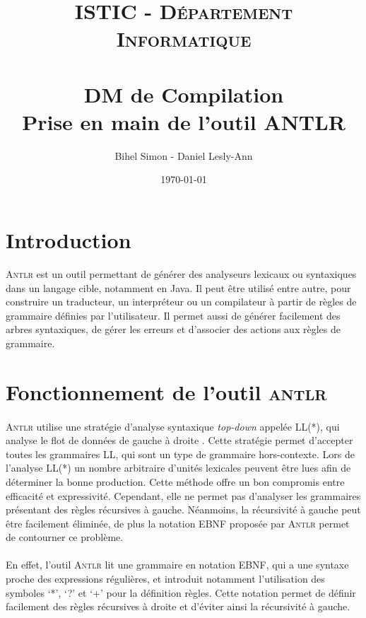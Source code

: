 \documentclass[paper=a4, fontsize=11pt]{scrartcl} %
\title{	
\normalfont \normalsize 
\textsc{ISTIC - Département Informatique} \\ [25pt]
\horrule{0.5pt} \\[0.4cm]
\huge DM de Compilation \\[0.2cm]
\Large Prise en main de l'outil ANTLR
\horrule{2pt} \\[0.5cm]
}
\author{Bihel Simon - Daniel Lesly-Ann}
\date{\normalsize\today}
\numberwithin{equation}{section} %
\numberwithin{figure}{section} %
\numberwithin{table}{section} %
\begin{document}
\maketitle


\section*{Introduction}
\textsc{Antlr} est un outil permettant de générer des analyseurs lexicaux ou syntaxiques dans un langage cible, notamment en Java. Il peut être utilisé entre autre, pour construire un traducteur, un interpréteur ou un compilateur à partir de règles de grammaire définies par l'utilisateur. Il permet aussi de générer facilement des arbres syntaxiques, de gérer les erreurs et d'associer des actions aux règles de grammaire.




\section{Fonctionnement de l'outil \textsc{antlr}}
\paragraph{}\textsc{Antlr} utilise une stratégie d'analyse syntaxique \textit{top-down} 
appelée LL(*), qui analyse le flot de données de gauche à droite . Cette stratégie permet d'accepter toutes les grammaires LL, qui sont un type de grammaire hors-contexte. Lors de l'analyse LL(*) un nombre arbitraire d'unités lexicales peuvent être lues afin de déterminer la bonne production. Cette méthode offre un bon compromis entre efficacité et expressivité. Cependant, elle ne permet pas d'analyser les grammaires présentant des règles récursives à gauche. Néanmoins, la récursivité à gauche peut être facilement éliminée, de plus la notation EBNF proposée par \textsc{Antlr} permet de contourner ce problème.


\paragraph{}En effet, l'outil \textsc{Antlr} lit une grammaire en notation EBNF, qui a une syntaxe
proche des expressions régulières, et introduit notamment l'utilisation des symboles `*', `?' et `+' pour la définition règles. Cette notation permet de définir facilement des règles récursives à droite et d'éviter ainsi la récursivité à gauche.
\end{document}
